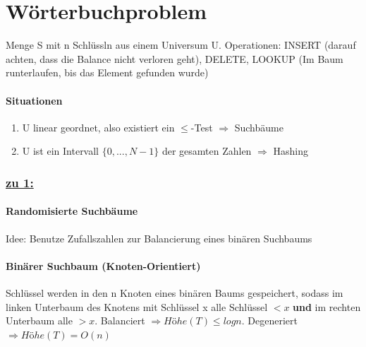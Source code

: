 
\section{Wörterbuchproblem}
Menge S mit n Schlüssln aus einem Universum U.
Operationen: INSERT (darauf achten, dass die Balance nicht verloren geht), DELETE, LOOKUP (Im Baum runterlaufen, bis das Element gefunden wurde)
\paragraph{Situationen}
\begin{enumerate}
    \item U linear geordnet, also existiert ein $ \leq $-Test $ \Rightarrow $ Suchbäume
    \item U ist ein Intervall $ \{0,..., N-1\} $ der gesamten Zahlen $ \Rightarrow $ Hashing
\end{enumerate}
\subsubsection{\underline{zu 1:}}

\paragraph{Randomisierte Suchbäume}
Idee: Benutze Zufallszahlen zur Balancierung eines binären Suchbaums

\paragraph{Binärer Suchbaum (Knoten-Orientiert)}
Schlüssel werden in den n Knoten eines binären Baums gespeichert, sodass im linken Unterbaum des Knotens mit Schlüssel x alle Schlüssel $ < x $ \textbf{und} im rechten Unterbaum alle $ > x $. Balanciert $ \Rightarrow Höhe(T)\leq logn$.  Degeneriert $ \Rightarrow Höhe(T) = O(n)$

